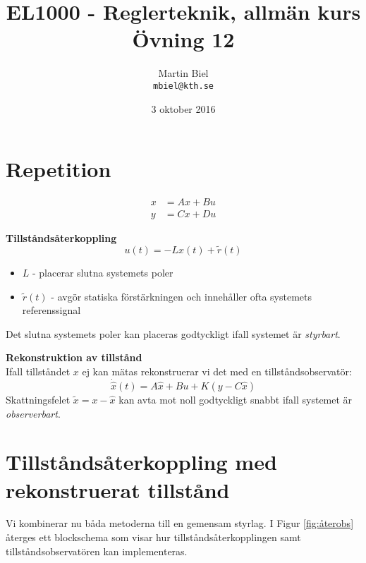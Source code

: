 \documentclass[12pt]{article}
\begin{document}
\begin{titlepage}
\author{Martin Biel \\ \texttt{mbiel@kth.se}}
\title{EL1000 - Reglerteknik, allmän kurs \\ \Large Övning 12}
\date{3 oktober 2016}
\end{titlepage}

\maketitle

\section*{Repetition}
\begin{align*}
  x &= Ax+Bu \\
  y &= Cx + Du
\end{align*}

\textbf{Tillståndsåterkoppling} 
\[u(t) = -Lx(t) + \tilde{r}(t)\]
\begin{itemize}
\item $L$ - placerar slutna systemets poler
\item $\tilde{r}(t)$ - avgör statiska förstärkningen och innehåller ofta systemets referenssignal
\end{itemize}
Det slutna systemets poler kan placeras godtyckligt ifall systemet är \emph{styrbart}.

\textbf{Rekonstruktion av tillstånd} \\
Ifall tillståndet $x$ ej kan mätas rekonstruerar vi det med en tillståndsobservatör: 
\[\dot{\hat{x}}(t) = A\hat{x} + Bu + K(y-C\hat{x})\]
Skattningsfelet $\tilde{x} = x - \hat{x}$ kan avta mot noll godtyckligt snabbt ifall systemet är \emph{observerbart}.

\section*{Tillståndsåterkoppling med rekonstruerat tillstånd}
Vi kombinerar nu båda metoderna till en gemensam styrlag. I Figur \ref{fig:återobs} återges ett blockschema som visar hur tillståndsåterkopplingen samt tillståndsobservatören kan implementeras.
\end{document}
